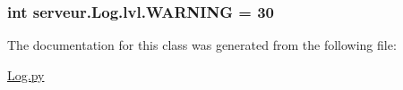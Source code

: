 \subsubsection[{W\+A\+R\+N\+I\+N\+G}]{\setlength{\rightskip}{0pt plus 5cm}int serveur.\+Log.\+lvl.\+W\+A\+R\+N\+I\+N\+G = 30\hspace{0.3cm}{\ttfamily [static]}}\label{classserveur_1_1_log_1_1lvl_ab256311e15a538d505fa9f217a1bdc5c}


The documentation for this class was generated from the following file\+:\begin{DoxyCompactItemize}
\item 
\hyperlink{_log_8py}{Log.\+py}\end{DoxyCompactItemize}
